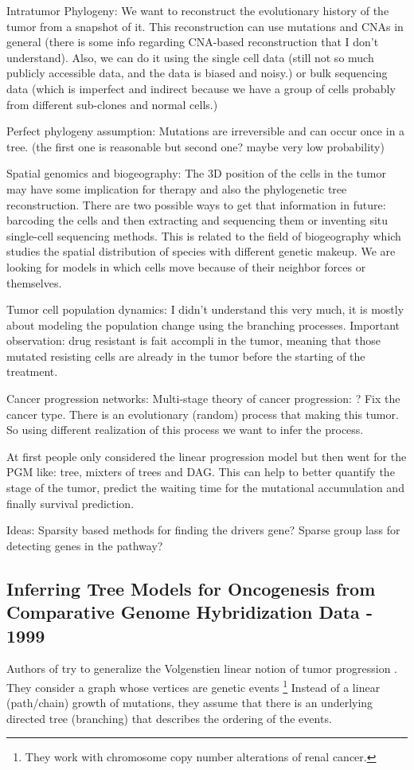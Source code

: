 	Intratumor Phylogeny:
	We want to reconstruct the evolutionary history of the tumor from a snapshot of it. 
	This reconstruction can use mutations and CNAs in general (there is some info regarding CNA-based reconstruction that I don't understand). 
	Also, we can do it using the single cell data (still not so much publicly accessible data, and the data is biased and noisy.) or bulk sequencing data (which is imperfect and indirect because we have a group of cells probably from different sub-clones and normal cells.)
	
	Perfect phylogeny assumption:
	Mutations are irreversible and can occur once in a tree. (the first one is reasonable but second one? maybe very low probability)
	
	Spatial genomics and biogeography:
	The 3D position of the cells in the tumor may have some implication for therapy and also the phylogenetic tree reconstruction. 
	There are two possible ways to get that information in future: barcoding the cells and then extracting and sequencing them or inventing situ single-cell sequencing methods. 
	This is related to the field of biogeography which studies the spatial distribution of species with different genetic makeup. 
	We are looking for models in which cells move because of their neighbor forces or themselves. 
	
	Tumor cell population dynamics:
	I didn't understand this very much, it is mostly about modeling the population change using the branching processes. 
	Important observation: drug resistant is fait accompli in the tumor, meaning that those mutated resisting cells are already in the tumor before the starting of the treatment. 
	
	Cancer progression networks:
	Multi-stage theory of cancer progression: ? 
	Fix the cancer type. There is an evolutionary (random) process that making this tumor. 
	So using different realization of this process we want to infer the process. 
	
	At first people only considered the linear progression model but then went for the PGM like: tree, mixters of trees and DAG. 
	This can help to better quantify the stage of the tumor, predict the waiting time for the mutational accumulation and finally survival prediction. 
	
	
	
	Ideas: 
	Sparsity based methods for finding the drivers gene?
	Sparse group lass for detecting genes in the pathway?  
	
	
	\subsection{Inferring Tree Models for Oncogenesis from Comparative Genome Hybridization Data \cite{desper99} - 1999}
	Authors of \cite{desper99} try to generalize the Volgenstien linear notion of tumor progression \cite{fearon90}. 
	They consider a graph whose vertices are genetic events \footnote{They work with chromosome copy number alterations of renal cancer.} 
	Instead of a linear (path/chain) growth of mutations, they assume that there is an underlying directed tree (branching) that describes the ordering of the events. 
	
